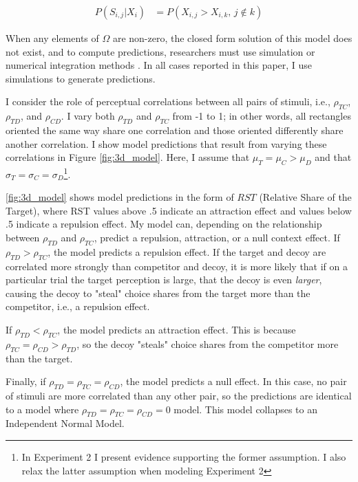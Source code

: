 \documentclass{umassthesis}          %
\begin{document}
\begin{align}
   P(S_{i,j} | X_{i}) &= P(X_{i,j} > X_{i,k}, \, j \notin k) 
   \label{eqn:pchoice}
\end{align}

When any elements of $\Omega$ are non-zero, the closed form solution of this model does not exist, and to compute predictions, researchers must use simulation or numerical integration methods \parencite{train2009discrete}. In all cases reported in this paper, I use simulations to generate predictions. 

I consider the role of perceptual correlations between all pairs of stimuli, i.e., $\rho_{TC}$, $\rho_{TD}$, and $\rho_{CD}$. I vary both $\rho_{TD}$ and $\rho_{TC}$ from -1 to 1; in other words, all rectangles oriented the same way share one correlation and those oriented differently share another correlation. I show model predictions that result from varying these correlations in Figure \ref{fig:3d_model}. Here, I assume that $\mu_{T}=\mu_{C}>\mu_{D}$ and that $\sigma_{T}=\sigma_{C}=\sigma_{D}$\footnote{In Experiment 2 I present evidence supporting the former assumption. I also relax the latter assumption when modeling Experiment 2}. 

\ref{fig:3d_model} shows model predictions in the form of $RST$ (Relative Share of the Target), where RST values above .5 indicate an attraction effect and values below .5 indicate a repulsion effect. My model can, depending on the relationship between $\rho_{TD}$ and $\rho_{TC}$, predict a repulsion, attraction, or a null context effect. If $\rho_{TD}>\rho_{TC}$, the model predicts a repulsion effect. If the target and decoy are correlated more strongly than competitor and decoy, it is more likely that if on a particular trial the target perception is large, that the decoy is even \textit{larger}, causing the decoy to "steal" choice shares from the target more than the competitor, i.e., a repulsion effect.

If $\rho_{TD}<\rho_{TC}$, the model predicts an attraction effect. This is because $\rho_{TC}=\rho_{CD}>\rho_{TD}$, so the decoy "steals" choice shares from the competitor more than the target. 

Finally, if $\rho_{TD}=\rho_{TC}=\rho_{CD}$, the model predicts a null effect. In this case, no pair of stimuli are more correlated than any other pair, so the predictions are identical to a model where $\rho_{TD}=\rho_{TC}=\rho_{CD}=0$ model. This model collapses to an Independent Normal Model. 
\end{document}
